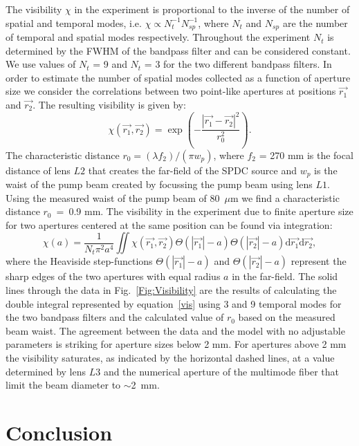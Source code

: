 The visibility $\chi$ in the experiment is proportional to the inverse of the number of spatial and temporal modes, i.e. $\chi \propto N_t^{-1} N_{sp}^{-1}$, where $N_t$ and $N_{sp}$ are the number of temporal and spatial modes respectively. Throughout the experiment $N_t$ is determined by the FWHM of the bandpass filter and can be considered constant. We use values of $N_t$ = 9 and $N_t$ = 3 for the two different bandpass filters. In order to estimate the number of spatial modes collected as a function of aperture size we consider the correlations between two point-like apertures at positions $\vec{r_1}$ and $\vec{r_2}$. The resulting visibility is given by:
\begin{equation}
\chi(\vec{r_1},\vec{r_2})=\exp(-\frac{|\vec{r_1}-\vec{r_2}|^2}{r_0^2}).
\end{equation}
The characteristic distance $r_0 = (\lambda f_2)/(\pi w_p)$, where $f_2$ = 270 mm is the focal distance of lens $L2$ that creates the far-field of the SPDC source and $w_p$ is the waist of the pump beam created by focussing the pump beam using lens $L1$. Using the measured waist of the pump beam of 80~$\mu$m we find a characteristic distance $r_0$~=~0.9 mm. The visibility in the experiment due to finite aperture size for two apertures centered at the same position can be found via integration:
\begin{equation}
 \chi (a) = \frac {1}{N_t \pi^2 a^4} \iint \chi(\vec{r_1},\vec{r_2}) \Theta(|\vec{r_1}|-a) \Theta(|\vec{r_2}|-a) \mathrm{d}\vec{r_1} \mathrm{d}\vec{r_2}, \label{vis}
\end{equation}
where the Heaviside step-functions $\Theta(|\vec{r_1}|-a)$ and $\Theta(|\vec{r_2}|-a)$ represent the sharp edges of the two apertures with equal radius $a$ in the far-field. The solid lines through the data in Fig.~\ref{Fig:Visibility} are the results of calculating the double integral represented by equation~\ref{vis} using 3 and 9 temporal modes for the two bandpass filters and the calculated value of $r_0$ based on the measured beam waist. The agreement between the data and the model with no adjustable parameters is striking for aperture sizes below 2 mm. For apertures above 2 mm the visibility saturates, as indicated by the horizontal dashed lines, at a value determined by lens $L3$ and the numerical aperture of the multimode fiber that limit the beam diameter to $\sim$2~mm.

\section{Conclusion}

